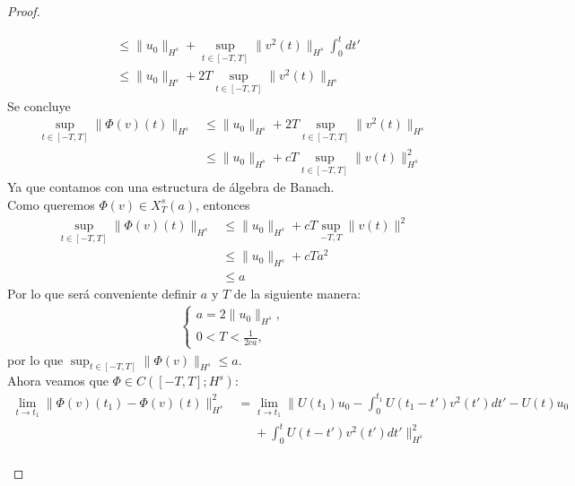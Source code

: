 \begin{proof}
\begin{enumerate}
\begin{enumerate}
\begin{align*}
                            &\leq \|u_{0}\|_{H^{s}} + \sup_{t \in [-T,T] }\| v^{2}(t)\|_{H^{s}} \int_{0}^{t} dt'\\
                            &\leq \|u_{0}\|_{H^{s}} + 2T \sup_{t \in [-T,T] }\| v^{2}(t)\|_{H^{s}}
                        \end{align*}
                        Se concluye
                        \begin{align*}
                        \sup_{t \in [-T,T]} \|\Phi (v) (t)\|_{H^{s}} &\leq \|u_{0}\|_{H^{s}} + 2T \sup_{t \in [-T,T]}\|v^{2}(t)\|_{H^{s}}\\
                        &\leq \|u_{0}\|_{H^{s}} + cT \sup_{t \in [-T,T]} \|v(t)\|^{2}_{H^{s}}
                        \end{align*}
                        Ya que contamos con una estructura de álgebra de Banach.\\ 
                        Como queremos $\Phi(v) \in X^{s}_{T}(a)$, entonces
                        \begin{align*}
                            \sup_{t \in [-T,T]} \|\Phi(v)(t)\|_{H^{s}} &\leq \| u_{0} \|_{H^{s}} + cT \sup_{-T,T} \| v(t) \|^{2}\\ 
                            &\leq \| u_{0} \|_{H^{s}} + cT a^{2}\\
                            &\leq a
                        \end{align*}
                        Por lo que será conveniente definir $a$ y $T$ de la siguiente manera:
                        \begin{align}\label{eq:T-y-a}
                            \begin{cases}
                                a = 2\| u_{0}\|_{H^{s}},\\
                                0< T < \frac{1}{2ca},
                            \end{cases}
                        \end{align}
                        por lo que $\sup_{t \in [-T,T] }\|\Phi (v) \|_{H^{s}} \leq a$.\\
                        Ahora veamos que $\Phi \in C([-T,T]; H^{s})$:
                        \begin{align*}
                            \lim_{t \rightarrow t_{1}} \|\Phi(v)(t_{1}) - \Phi(v)(t)\|_{H^{s}}^2 &= \lim_{t \rightarrow t_{1}} \| U(t_{1})u_{0} - \int_{0}^{t_{1}} U(t_{1}-t')v^{2}(t')dt' - U(t)u_{0}\\ 
                            &\phantom{=}+\int_{0}^{t} U(t-t')v^{2}(t')dt'\|_{H^{s}}^2\\ 

\end{align*}
\end{enumerate}
\end{enumerate}
\end{proof}

